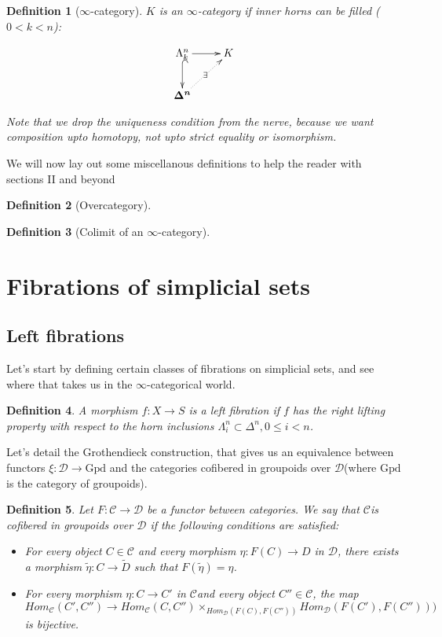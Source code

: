 \documentclass{amsart}
\newcommand{\8}{\ensuremath{\infty}}
\newcommand{\C}{\ensuremath{\mathscr{C}}}
\newcommand{\D}{\ensuremath{\mathscr{D}}}
\newcommand{\Horn}[2]{\ensuremath{\Lambda^{#1}_{#2}}}
\newcommand{\Simplex}[1]{\ensuremath{\boldsymbol{\Delta^{#1}}}}
\newcommand{\Gpd}{\ensuremath{\text{Gpd}}}
\newtheorem{definition}{Definition}
\begin{document}
\begin{definition}[\8-category]
  $K$ is an \8-category if inner horns can be filled ($0 < k < n$):

  $$
    \begin{xy}
      \xymatrix{
        \Horn{n}{k}\ar[r]\ar@{^{(}->}[d] & K \\
        \Simplex{n}\ar@{.>}[ur]|\exists &
      }
    \end{xy}
  $$

  Note that we drop the uniqueness condition from the nerve, because we want composition upto homotopy, not upto strict equality or isomorphism.
\end{definition}

We will now lay out some miscellanous definitions to help the reader with sections II and beyond

\begin{definition}[Overcategory]
\end{definition}

\begin{definition}[Colimit of an \8-category]
\end{definition}

\section{Fibrations of simplicial sets}

\subsection{Left fibrations}
Let's start by defining certain classes of fibrations on simplicial sets, and see where that takes us in the \8-categorical world.

\begin{definition}
  A morphism $f:X\rightarrow S$ is a left fibration if $f$ has the right lifting property with respect to the horn inclusions $\Lambda_i^n\subset \Delta^n, 0\leq i < n$.
\end{definition}

Let's detail the Grothendieck construction, that gives us an equivalence between functors $\xi : \D\rightarrow \Gpd$ and the categories cofibered in groupoids over \D (where \Gpd is the category of groupoids).

\begin{definition}
  Let $F:\C\rightarrow \D$ be a functor between categories. We say that \C is cofibered in groupoids over \D
  if the following conditions are satisfied:
  \begin{itemize}
    \item For every object $C \in \C$ and every morphism $\eta: F(C) \rightarrow D$ in \D , there exists a morphism $\tilde{\eta} : C \rightarrow \tilde{D}$ such that $F(\tilde{\eta}) = \eta$.
    \item For every morphism $\eta: C \rightarrow C'$ in \C and every object $C'' \in \C$, the map
          $$
            Hom_\mathcal{C}(C',C'')\rightarrow Hom_\mathcal{C}(C,C'')\times_{Hom_\mathcal{D}(F(C),F(C''))}Hom_\mathcal{D}(F(C'),F(C'')))
          $$
          is bijective.
  \end{itemize}
\end{definition}
\end{document}
